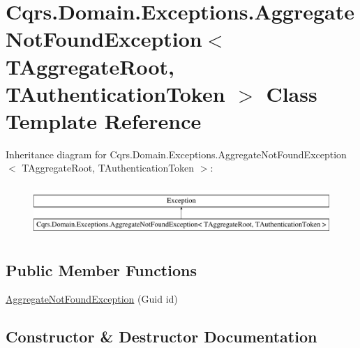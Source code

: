 \hypertarget{classCqrs_1_1Domain_1_1Exceptions_1_1AggregateNotFoundException}{}\section{Cqrs.\+Domain.\+Exceptions.\+Aggregate\+Not\+Found\+Exception$<$ T\+Aggregate\+Root, T\+Authentication\+Token $>$ Class Template Reference}
\label{classCqrs_1_1Domain_1_1Exceptions_1_1AggregateNotFoundException}
Inheritance diagram for Cqrs.\+Domain.\+Exceptions.\+Aggregate\+Not\+Found\+Exception$<$ T\+Aggregate\+Root, T\+Authentication\+Token $>$\+:\begin{figure}[H]
\begin{center}
\leavevmode
\includegraphics[height=1.947826cm]{classCqrs_1_1Domain_1_1Exceptions_1_1AggregateNotFoundException}
\end{center}
\end{figure}
\subsection*{Public Member Functions}
\begin{DoxyCompactItemize}
\item 
\hyperlink{classCqrs_1_1Domain_1_1Exceptions_1_1AggregateNotFoundException_a44057befbb31c652727d04c5b34211ee_a44057befbb31c652727d04c5b34211ee}{Aggregate\+Not\+Found\+Exception} (Guid id)
\end{DoxyCompactItemize}


\subsection{Constructor \& Destructor Documentation}
\mbox{\label{classCqrs_1_1Domain_1_1Exceptions_1_1AggregateNotFoundException_a44057befbb31c652727d04c5b34211ee_a44057befbb31c652727d04c5b34211ee}} 
